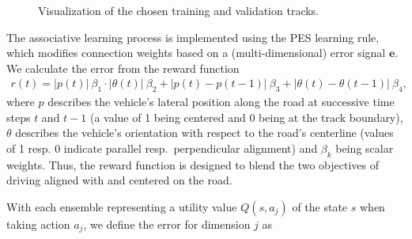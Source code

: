 \begin{figure}[t!]
\centering
{}
\hspace{1cm}
\caption{Visualization of the chosen training and validation tracks.}
\label{fig:tracks}
\end{figure}
The associative learning process is implemented using the \ac{PES} \cite{Bekolay2013} learning rule, which modifies connection weights based on a (multi-dimensional) error signal $\textbf{e}$.
We calculate the error from the reward function
\begin{align}
r(t) = \lvert p(t) \rvert~\beta_1 \cdot \lvert \theta(t) \rvert ~ \beta_2+ \lvert p(t)-p(t-1) \rvert ~ \beta_3+ \lvert \theta(t)-\theta(t-1) \rvert ~ \beta_4 \text{,}
\label{eq:reward}
\end{align}
where $p$ describes the vehicle's lateral position along the road at successive time steps $t$ and $t-1$ (a value of \num{1} being centered and \num{0} being at the track boundary), $\theta$ describes the vehicle's orientation with respect to the road's centerline (values of \num{1} resp. \num{0} indicate parallel resp.\ perpendicular alignment) and $\beta_k$ being scalar weights.
Thus, the reward function is designed to blend the two objectives of driving aligned with and centered on the road.

With each ensemble representing a utility value $Q(s,a_j)$ of the state $s$  when taking action $a_j$, we define the error for dimension $j$ as

